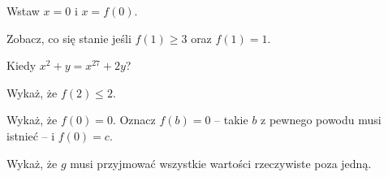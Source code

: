 
\begin{hints_list}
	\item Wstaw $x = 0$ i $x = f(0)$.
	\item Zobacz, co się stanie jeśli $f(1) \geqslant 3$ oraz $f(1) = 1$.
	\item Kiedy $x^2 + y = x^{27} + 2y$?
	\item Wykaż, że $f(2) \leqslant 2$.
	\item Wykaż, że $f(0) = 0$. Oznacz $f(b) = 0$ -- takie $b$ z pewnego powodu musi istnieć --  i $f(0) = c$.
	\item Wykaż, że $g$ musi przyjmować wszystkie wartości rzeczywiste poza jedną.
\end{hints_list}